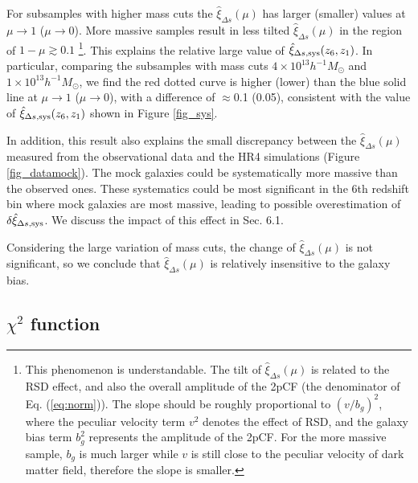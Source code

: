\documentclass[iop]{emulateapj}
\begin{document}
For subsamples with higher mass cuts the $\hat\xi_{\Delta s}(\mu)$
has larger (smaller) values at $\mu\rightarrow1$ ($\mu\rightarrow0$).
More massive samples result in less tilted $\hat\xi_{\Delta s}(\mu)$ in the region of $1-\mu\gtrsim0.1$
\footnote{This phenomenon is understandable.
The tilt of $\hat\xi_{\Delta s}(\mu)$ is related to the RSD effect, 
and also the overall amplitude of the 2pCF (the denominator of Eq. (\ref{eq:norm})).
The slope should be roughly proportional to $(v/b_g)^2$, 
where the peculiar velocity term $v^2$ denotes the effect of RSD, 
and the galaxy bias term $b_g^2$ represents the amplitude of the 2pCF. 
For the more massive sample, $b_g$ is much larger while $v$ is still close to the peculiar velocity of dark matter field,
therefore the slope is smaller.
}.
This explains the relative large value of $\hat \xi_{\Delta s,\rm sys}(z_6, z_1)$.
In particular, comparing the subsamples with mass cuts $4\times 10^{13}h^{-1} M_{\odot}$ and $1\times 10^{13}h^{-1} M_{\odot}$, 
we find the red dotted curve is higher (lower) than the blue solid line at $\mu\rightarrow1$ ($\mu\rightarrow0$),
with a difference of $\approx$0.1 (0.05),
consistent with the value of $\hat \xi_{\Delta s,\rm sys}(z_6, z_1)$ shown in Figure \ref{fig_sys}.

In addition, this result also explains the small discrepancy between the $\hat\xi_{\Delta s}(\mu)$ measured from the 
observational data and the HR4 simulations (Figure \ref{fig_datamock}).
The mock galaxies could be systematically more massive than the observed ones.
These systematics could be most significant in the 6th redshift bin
where mock galaxies are most massive, 
leading to possible overestimation of $\delta\hat\xi_{\Delta s,{\rm sys}}$.
We discuss the impact of this effect in Sec. 6.1.

Considering the large variation of mass cuts, the change of $\hat\xi_{\Delta s}(\mu)$ is not significant,
so we conclude that $\hat\xi_{\Delta s}(\mu)$ is relatively insensitive to the galaxy bias.




\subsection{$\chi^2$ function}\label{sec:likelihood}
\end{document}
